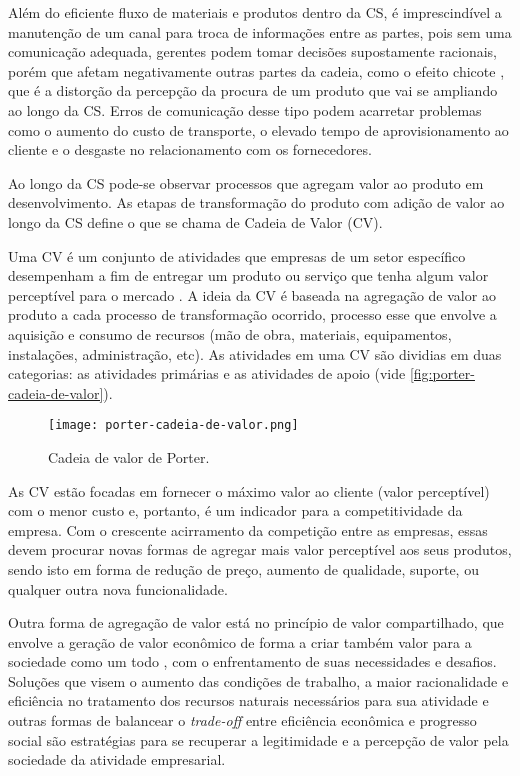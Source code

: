 Além do eficiente fluxo de materiais e produtos dentro da CS, é imprescindível a manutenção de um canal para troca de informações entre as partes, pois sem uma comunicação adequada, gerentes podem tomar decisões supostamente racionais, porém que afetam negativamente outras partes da cadeia, como o efeito chicote \cite{lee1997bullwhip}, que é a distorção da percepção da procura de um produto que vai se ampliando ao longo da CS. Erros de comunicação desse tipo podem acarretar problemas como o aumento do custo de transporte, o elevado tempo de aprovisionamento ao cliente e o desgaste no relacionamento com os fornecedores.

Ao longo da CS pode-se observar processos que agregam valor ao produto em desenvolvimento. As etapas de transformação do produto com adição de valor ao longo da CS define o que se chama de Cadeia de Valor (CV).

Uma CV é um conjunto de atividades que empresas de um setor específico desempenham a fim de entregar um produto ou serviço que tenha algum valor perceptível para o mercado \cite{porter1985competitiveadvantage}. A ideia da CV é baseada na agregação de valor ao produto a cada processo de transformação ocorrido, processo esse que envolve a aquisição e consumo de recursos (mão de obra, materiais, equipamentos, instalações, administração, etc). As atividades em uma CV são dividias em duas categorias: as atividades primárias e as atividades de apoio \cite{porter1985competitiveadvantage} (vide \autoref{fig:porter-cadeia-de-valor}).

\begin{figure}[htb]
	\centering
	\texttt{[image: porter-cadeia-de-valor.png]}
	\caption{Cadeia de valor de Porter.}
	\label{fig:porter-cadeia-de-valor}
\end{figure}

As CV estão focadas em fornecer o máximo valor ao cliente (valor perceptível) com o menor custo e, portanto, é um indicador para a competitividade da empresa. Com o crescente acirramento da competição entre as empresas, essas devem procurar novas formas de agregar mais valor perceptível aos seus produtos, sendo isto em forma de redução de preço, aumento de qualidade, suporte, ou qualquer outra nova funcionalidade.

Outra forma de agregação de valor está no princípio de valor compartilhado, que envolve a geração de valor econômico de forma a criar também valor para a sociedade como um todo \cite{porter2011valorcompartilhado}, com o enfrentamento de suas necessidades e desafios. Soluções que visem o aumento das condições de trabalho, a maior racionalidade e eficiência no tratamento dos recursos naturais necessários para sua atividade e outras formas de balancear o \textit{trade-off} entre eficiência econômica e progresso social são estratégias para se recuperar a legitimidade e a percepção de valor pela sociedade da atividade empresarial.

